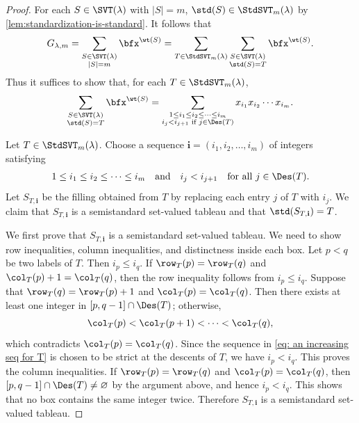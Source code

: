 \documentclass[12pt, reqno]{amsart}
\numberwithin{equation}{section}
\numberwithin{figure}{section}
\numberwithin{table}{section}
\theoremstyle{definition}
\begin{document}
\begin{proof}
For each $S \in \SVT(\lambda)$ with $|S|=m$, $\std(S)\in\StdSVT_m(\lambda)$ by \cref{lem:standardization-is-standard}.
It follows that
\[
G_{\lambda,m}
=\sum_{\substack{S \in \SVT(\lambda) \\ |S|=m}}\bfx^{\wt(S)}
=\sum_{T \in \StdSVT_m(\lambda)} \sum_{\substack{S \in \SVT(\lambda) \\ \std(S) = T}}
\bfx^{\wt(S)}.
\]
Thus it suffices to show that, for each $T \in \StdSVT_m(\lambda)$,
\begin{align}\label{eq: stable groth F expansion for a fixed T}
\sum_{\substack{S \in \SVT(\lambda) \\ \std(S)=T}} \bfx^{\wt(S)}
= \sum_{\substack{1 \le i_1 \le i_2 \le \cdots \le i_m \\ i_j < i_{j+1} \text{ if } j \in \Des(T)}} x_{i_1}x_{i_2}\cdots x_{i_m}.
\end{align}



Let $T\in\StdSVT_m(\lambda)$.
Choose a sequence $\mathbf{i}=(i_1,i_2,\ldots,i_m)$ of integers satisfying
\begin{align}\label{eq: an increasing seq for T}
1 \le i_1\le i_2\le\cdots\le i_m
\quad\text{and}\quad
i_j<i_{j+1}\quad\text{for all }j\in\Des(T).
\end{align}
Let $S_{T,\mathbf{i}}$ be the filling obtained from $T$ by replacing each entry $j$ of $T$ with $i_j$.
We claim that $S_{T,\mathbf{i}}$ is a semistandard set-valued tableau and that
$\std(S_{T,\mathbf{i}})=T$.

We first prove that $S_{T,\mathbf{i}}$ is a semistandard set-valued tableau.
We need to show row inequalities, column inequalities, and distinctness inside each box.
Let $p<q$ be two labels of $T$.
Then $i_p\le i_q$.
If $\row_T(p)=\row_T(q)$ and $\col_T(p)+1=\col_T(q)$, then the row inequality follows from $i_p\le i_q$.
Suppose that $\row_T(q)=\row_T(p)+1$ and $\col_T(p)=\col_T(q)$.
Then there exists at least one integer in $[p,q-1] \cap \Des(T)$; otherwise,
\[
\col_T(p)<\col_T(p+1)<\cdots<\col_T(q),
\]
which contradicts $\col_T(p)=\col_T(q)$.
Since the sequence in \cref{eq: an increasing seq for T} is chosen to be strict at the descents of $T$, we have $i_p < i_q$.
This proves the column inequalities.
If $\row_T(p)=\row_T(q)$ and $\col_T(p)=\col_T(q)$, then $[p,q-1]\cap\Des(T)\ne\varnothing$ by the argument above, and hence $i_p<i_q$.
This shows that no box contains the same integer twice.
Therefore $S_{T,\mathbf{i}}$ is a semistandard set-valued tableau.


\end{proof}
\end{document}
